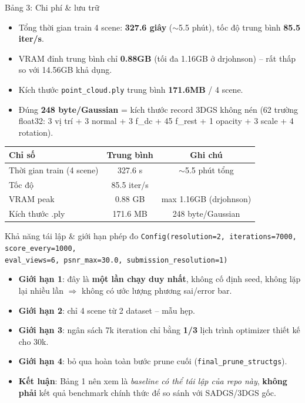 \begin{frame}{Bảng 3: Chi phí \& lưu trữ}
\begin{itemize}
    \item Tổng thời gian train 4 scene: \textbf{327.6 giây} ($\sim$5.5 phút), tốc độ trung bình \textbf{85.5 iter/s}.
    \item VRAM đỉnh trung bình chỉ \textbf{0.88GB} (tối đa 1.16GB ở drjohnson) -- rất thấp so với 14.56GB khả dụng.
    \item Kích thước \texttt{point\_cloud.ply} trung bình \textbf{171.6MB} / 4 scene.
    \item Đúng \textbf{248 byte/Gaussian} = kích thước record 3DGS không nén (62 trường float32: 3 vị trí + 3 normal + 3 f\_dc + 45 f\_rest + 1 opacity + 3 scale + 4 rotation).
\end{itemize}
\vspace{0.3em}
\footnotesize
\centering
\begin{tabular}{lcc}
\toprule
\textbf{Chỉ số} & \textbf{Trung bình} & \textbf{Ghi chú} \\
\midrule
Thời gian train (4 scene) & 327.6 s & $\sim$5.5 phút tổng \\
Tốc độ & 85.5 iter/s & \\
VRAM peak & 0.88 GB & max 1.16GB (drjohnson) \\
Kích thước .ply & 171.6 MB & 248 byte/Gaussian \\
\bottomrule
\end{tabular}
\end{frame}

\begin{frame}{Khả năng tái lập \& giới hạn phép đo}
\footnotesize
\texttt{Config(resolution=2, iterations=7000, score\_every=1000,\\
\hspace{2em}eval\_views=6, psnr\_max=30.0, submission\_resolution=1)}
\normalsize
\vspace{0.5em}
\begin{itemize}
    \item \textbf{Giới hạn 1}: đây là \textbf{một lần chạy duy nhất}, không cố định seed, không lặp lại nhiều lần $\Rightarrow$ không có ước lượng phương sai/error bar.
    \item \textbf{Giới hạn 2}: chỉ 4 scene từ 2 dataset -- mẫu hẹp.
    \item \textbf{Giới hạn 3}: ngân sách 7k iteration chỉ bằng \textbf{1/3} lịch trình optimizer thiết kế cho 30k.
    \item \textbf{Giới hạn 4}: bỏ qua hoàn toàn bước prune cuối (\texttt{final\_prune\_structgs}).
    \item[$\Rightarrow$] \textbf{Kết luận}: Bảng 1 nên xem là \emph{baseline có thể tái lập của repo này}, \textbf{không phải} kết quả benchmark chính thức để so sánh với SADGS/3DGS gốc.
\end{itemize}
\end{frame}
